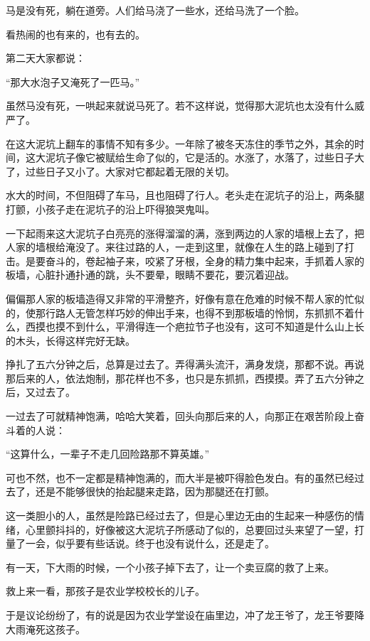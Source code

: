 \par 马是没有死，躺在道旁。人们给马浇了一些水，还给马洗了一个脸。
\par 看热闹的也有来的，也有去的。
\par 第二天大家都说：
\par “那大水泡子又淹死了一匹马。”
\par 虽然马没有死，一哄起来就说马死了。若不这样说，觉得那大泥坑也太没有什么威严了。
\par 在这大泥坑上翻车的事情不知有多少。一年除了被冬天冻住的季节之外，其余的时间，这大泥坑子像它被赋给生命了似的，它是活的。水涨了，水落了，过些日子大了，过些日子又小了。大家对它都起着无限的关切。
\par 水大的时间，不但阻碍了车马，且也阻碍了行人。老头走在泥坑子的沿上，两条腿打颤，小孩子走在泥坑子的沿上吓得狼哭鬼叫。
\par 一下起雨来这大泥坑子白亮亮的涨得溜溜的满，涨到两边的人家的墙根上去了，把人家的墙根给淹没了。来往过路的人，一走到这里，就像在人生的路上碰到了打击。是要奋斗的，卷起袖子来，咬紧了牙根，全身的精力集中起来，手抓着人家的板墙，心脏扑通扑通的跳，头不要晕，眼睛不要花，要沉着迎战。
\par 偏偏那人家的板墙造得又非常的平滑整齐，好像有意在危难的时候不帮人家的忙似的，使那行路人无管怎样巧妙的伸出手来，也得不到那板墙的怜悯，东抓抓不着什么，西摸也摸不到什么，平滑得连一个疤拉节子也没有，这可不知道是什么山上长的木头，长得这样完好无缺。
\par 挣扎了五六分钟之后，总算是过去了。弄得满头流汗，满身发烧，那都不说。再说那后来的人，依法炮制，那花样也不多，也只是东抓抓，西摸摸。弄了五六分钟之后，又过去了。
\par 一过去了可就精神饱满，哈哈大笑着，回头向那后来的人，向那正在艰苦阶段上奋斗着的人说：
\par “这算什么，一辈子不走几回险路那不算英雄。”
\par 可也不然，也不一定都是精神饱满的，而大半是被吓得脸色发白。有的虽然已经过去了，还是不能够很快的抬起腿来走路，因为那腿还在打颤。
\par 这一类胆小的人，虽然是险路已经过去了，但是心里边无由的生起来一种感伤的情绪，心里颤抖抖的，好像被这大泥坑子所感动了似的，总要回过头来望了一望，打量了一会，似乎要有些话说。终于也没有说什么，还是走了。
\par 有一天，下大雨的时候，一个小孩子掉下去了，让一个卖豆腐的救了上来。
\par 救上来一看，那孩子是农业学校校长的儿子。
\par 于是议论纷纷了，有的说是因为农业学堂设在庙里边，冲了龙王爷了，龙王爷要降大雨淹死这孩子。
